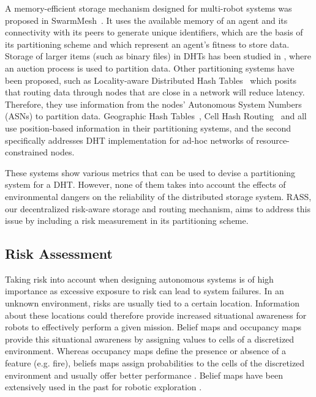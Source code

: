 \documentclass[runningheads]{llncs}
\begin{document}
A memory-efficient storage mechanism designed for multi-robot systems
was proposed in SwarmMesh~\cite{majcherczykSwarmmesh2020}. It
uses the available memory of an agent and its connectivity with its
peers to generate unique identifiers, which are the basis of its
partitioning scheme and which represent an agent's fitness to store
data. Storage of larger items (such as binary files) in DHTs has been
studied in \cite{varadharajan2020soul}, where an auction process is
used to partition data.  Other partitioning systems have been
proposed, such as Locality-aware Distributed Hash
Tables~\cite{wu2008ldht} which posits that routing data through nodes
that are close in a network will reduce latency. Therefore, they use
information from the nodes' Autonomous System Numbers (ASNs) to
partition data.  Geographic Hash Tables~\cite{ratnasamy2002ght}, Cell
Hash Routing~\cite{araujo2005chr} and \cite{ahullo2008supporting} all
use position-based information in their partitioning systems, and the
second specifically addresses DHT implementation for ad-hoc networks
of resource-constrained nodes.

These systems show various metrics that can be used to devise a
partitioning system for a DHT. However, none of them takes into
account the effects of environmental dangers on the reliability of the
distributed storage system. RASS, our decentralized risk-aware storage and routing mechanism, aims to address this issue by including
a risk measurement in its partitioning scheme.

\subsection{Risk Assessment}

Taking risk into account when designing autonomous systems is of high
importance as excessive exposure to risk can lead to system
failures. In an unknown environment, risks are usually
tied to a certain location. Information about these locations could therefore
provide increased situational awareness for robots to effectively
perform a given mission. Belief maps and occupancy maps provide this
situational awareness by assigning values to cells of a discretized
environment. Whereas occupancy maps define the presence or absence of
a feature (e.g. fire), beliefs maps assign probabilities to the cells
of the discretized environment and usually offer better performance
\cite{stachnissMappingExplorationMobile2003}. Belief maps have been
extensively used in the past for robotic exploration
\cite{kobayashiSharingExploringInformation2002,kobayashiDeterminationExplorationTarget2003,indelmanCooperativeMultirobotBelief2018}.
\end{document}
